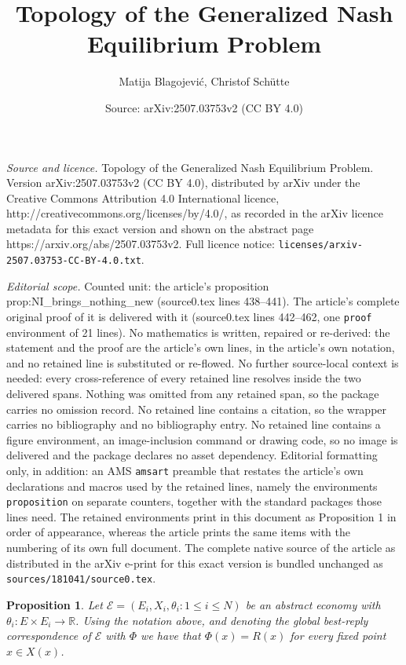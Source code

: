 \documentclass[10pt,a4paper]{amsart}
\title{Topology of the Generalized Nash Equilibrium Problem}
\author{Matija Blagojevi\'c, Christof Sch\"utte}
\date{Source: arXiv:2507.03753v2 (CC BY 4.0)}
\newtheorem{proposition}{Proposition}
\begin{document}
\maketitle

\noindent\emph{Source and licence.} Topology of the Generalized Nash Equilibrium Problem. Version arXiv:2507.03753v2 (CC BY 4.0), distributed by arXiv under the Creative Commons Attribution 4.0 International licence, http://creativecommons.org/licenses/by/4.0/, as recorded in the arXiv licence metadata for this exact version and shown on the abstract page https://arxiv.org/abs/2507.03753v2. Full licence notice: \texttt{licenses/arxiv-2507.03753-CC-BY-4.0.txt}.\par\smallskip

\noindent\textit{Editorial scope.} Counted unit: the article's proposition prop:NI\_brings\_nothing\_new (source0.tex lines 438--441). The article's complete original proof of it is delivered with it (source0.tex lines 442--462, one \texttt{proof} environment of 21 lines). No mathematics is written, repaired or re-derived: the statement and the proof are the article's own lines, in the article's own notation, and no retained line is substituted or re-flowed.  No further source-local context is needed: every cross-reference of every retained line resolves inside the two delivered spans.  Nothing was omitted from any retained span, so the package carries no omission record.  No retained line contains a citation, so the wrapper carries no bibliography and no bibliography entry.  No retained line contains a figure environment, an image-inclusion command or drawing code, so no image is delivered and the package declares no asset dependency.  Editorial formatting only, in addition: an AMS \texttt{amsart} preamble that restates the article's own declarations and macros used by the retained lines, namely the environments \texttt{proposition} on separate counters, together with the standard packages those lines need.  The retained environments print in this document as Proposition 1 in order of appearance, whereas the article prints the same items with the numbering of its own full document.  The complete native source of the article as distributed in the arXiv e-print for this exact version is bundled unchanged as \texttt{sources/181041/source0.tex}.
\begin{proposition}\label{prop:NI_brings_nothing_new}
	Let $\mathcal{E}= (E_i,X_i,\theta_i : 1\leq i\leq N)$ be an abstract economy with $\theta_i\colon E\times E_i\longrightarrow\mathbb{R}$.
	Using the notation above, and denoting the global best-reply correspondence of $\mathcal{E}$ with $\Phi$ we have that $\Phi(x) = R(x)$ for every fixed point $x\in X(x)$.
\end{proposition}
\end{document}
